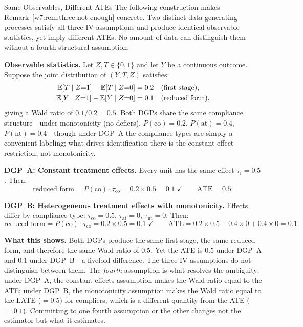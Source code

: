 \documentclass[master.tex]{subfiles}
\begin{document}
\begin{example}{Same Observables, Different ATEs}
\label{w7:ex:ident-failure}
The following construction makes Remark~\ref{w7:rem:three-not-enough}
concrete.  Two distinct data-generating processes satisfy all three IV
assumptions and produce identical observable statistics, yet imply
different ATEs.  No amount of data can distinguish them without a
fourth structural assumption.

\medskip
\noindent\textbf{Observable statistics.}
Let $Z, T \in \{0,1\}$ and let $Y$ be a continuous outcome.
Suppose the joint distribution of $(Y, T, Z)$ satisfies:
\begin{align*}
  \mathbb{E}[T \mid Z{=}1] - \mathbb{E}[T \mid Z{=}0] &= 0.2 \quad
    \text{(first stage)}, \\
  \mathbb{E}[Y \mid Z{=}1] - \mathbb{E}[Y \mid Z{=}0] &= 0.1 \quad
    \text{(reduced form)},
\end{align*}
giving a Wald ratio of $0.1/0.2 = 0.5$.  Both DGPs share the same
compliance structure---under monotonicity (no defiers),
$P(\mathrm{co}) = 0.2$, $P(\mathrm{at}) = 0.4$,
$P(\mathrm{nt}) = 0.4$---though under DGP~A the compliance types
are simply a convenient labeling; what drives identification there is
the constant-effect restriction, not monotonicity.

\medskip
\noindent\textbf{DGP~A: Constant treatment effects.}
Every unit has the same effect $\tau_i = 0.5$.  Then:
\[
  \text{reduced form}
  = P(\mathrm{co}) \cdot \tau_{\mathrm{co}}
  = 0.2 \times 0.5 = 0.1 \;\checkmark
  \qquad
  \mathrm{ATE} = 0.5.
\]

\medskip
\noindent\textbf{DGP~B: Heterogeneous treatment effects with
monotonicity.}  Effects differ by compliance type:
$\tau_{\mathrm{co}} = 0.5$, $\tau_{\mathrm{at}} = 0$,
$\tau_{\mathrm{nt}} = 0$.  Then:
\[
  \text{reduced form}
  = P(\mathrm{co}) \cdot \tau_{\mathrm{co}}
  = 0.2 \times 0.5 = 0.1 \;\checkmark
  \qquad
  \mathrm{ATE}
  = 0.2 \times 0.5 + 0.4 \times 0 + 0.4 \times 0
  = 0.1.
\]

\medskip
\noindent\textbf{What this shows.}
Both DGPs produce the same first stage, the same reduced form, and
therefore the same Wald ratio of $0.5$.  Yet the ATE is $0.5$ under
DGP~A and $0.1$ under DGP~B---a fivefold difference.  The three IV
assumptions do not distinguish between them.  The \emph{fourth}
assumption is what resolves the ambiguity: under DGP~A, the constant
effects assumption makes the Wald ratio equal to the ATE; under
DGP~B, the monotonicity assumption makes the Wald ratio equal to the
LATE ($= 0.5$) for compliers, which is a different quantity from the
ATE ($= 0.1$).  Committing to one fourth assumption or the other
changes not the estimator but what it estimates.
\end{example}
\end{document}
